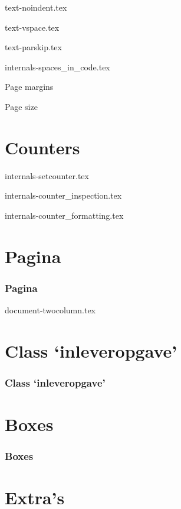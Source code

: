 \documentclass{cursuspresentatie}
\def\importslide#1#2{%
    {#2}
}
\begin{document}
    \importslide{text}{text-noindent.tex}

    \importslide{text}{text-vspace.tex}

    \importslide{text}{text-parskip.tex}

    \importslide{internals}{internals-spaces_in_code.tex}

    \begin{frame}
        Page margins
    \end{frame}

    \begin{frame}
        Page size
    \end{frame}


    \section{Counters}

    \importslide{internals}{internals-setcounter.tex}

    \importslide{internals}{internals-counter_inspection.tex}

    \importslide{internals}{internals-counter_formatting.tex}

    \section{Pagina}

    \begin{frame}
        \frametitle{Pagina}
    \end{frame}

    \importslide{document}{document-twocolumn.tex}

    \section{Class `inleveropgave'}

    \begin{frame}
        \frametitle{Class `inleveropgave'}
    \end{frame}

    \section{Boxes}
    \begin{frame}
        \frametitle{Boxes}
    \end{frame}

    \section{Extra's}
\end{document}
